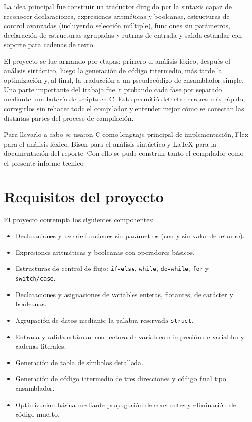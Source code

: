 \documentclass[12pt]{article}
\begin{document}
La idea principal fue construir un traductor dirigido por la sintaxis capaz de reconocer declaraciones, expresiones aritméticas y booleanas, estructuras de control avanzadas (incluyendo selección múltiple), funciones sin parámetros, declaración de estructuras agrupadas y rutinas de entrada y salida estándar con soporte para cadenas de texto. 

El proyecto se fue armando por etapas: primero el análisis léxico, después el análisis sintáctico, luego la generación de código intermedio, más tarde la optimización y, al final, la traducción a un pseudocódigo de ensamblador simple. Una parte importante del trabajo fue ir probando cada fase por separado mediante una batería de scripts en C. Esto permitió detectar errores más rápido, corregirlos sin rehacer todo el compilador y entender mejor cómo se conectan las distintas partes del proceso de compilación.

Para llevarlo a cabo se usaron C como lenguaje principal de implementación, Flex para el análisis léxico, Bison para el análisis sintáctico y LaTeX para la documentación del reporte. Con ello se pudo construir tanto el compilador como el presente informe técnico.

\section{Requisitos del proyecto}
El proyecto contempla los siguientes componentes:
\begin{itemize}[label={-}]
    \item Declaraciones y uso de funciones sin parámetros (con y sin valor de retorno).
    \item Expresiones aritméticas y booleanas con operadores básicos.
    \item Estructuras de control de flujo: \texttt{if-else}, \texttt{while}, \texttt{do-while}, \texttt{for} y \texttt{switch/case}.
    \item Declaraciones y asignaciones de variables enteras, flotantes, de carácter y booleanas.
    \item Agrupación de datos mediante la palabra reservada \texttt{struct}.
    \item Entrada y salida estándar con lectura de variables e impresión de variables y cadenas literales.
    \item Generación de tabla de símbolos detallada.
    \item Generación de código intermedio de tres direcciones y código final tipo ensamblador.
    \item Optimización básica mediante propagación de constantes y eliminación de código muerto.
\end{itemize}
\end{document}
